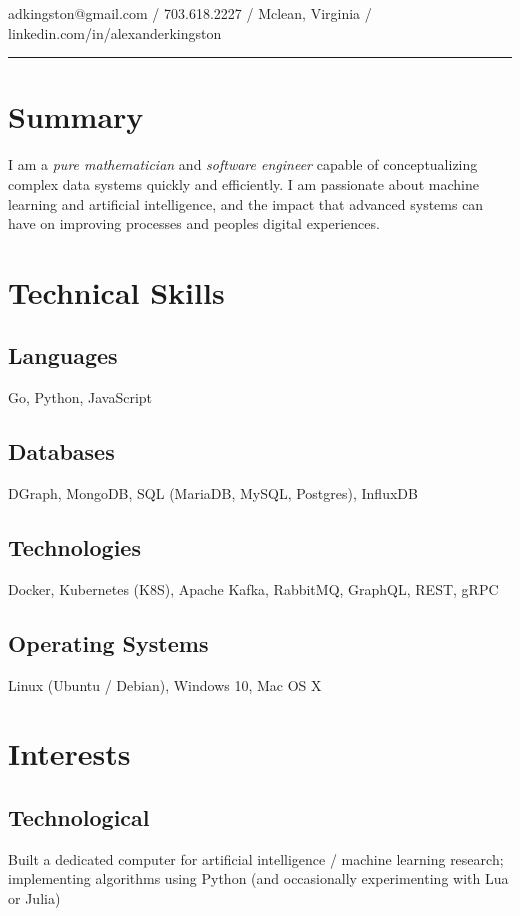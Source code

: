 \documentclass{adk_cv}
\begin{document}
\color{default}
\noindent {}

\noindent adkingston@gmail.com \hfill / \hfill 703.618.2227 \hfill / \hfill Mclean, Virginia \hfill / \hfill linkedin.com/in/alexanderkingston
\noindent\rule{\textwidth}{1pt}

\begingroup\hspace{-15pt}\endgroup
\begin{minipage}[t]{\dimexpr.36\linewidth}
    \begin{flushleft}
    \section{Summary}
    I am a \textit{pure mathematician} and \textit{software engineer} capable of conceptualizing complex data systems quickly and efficiently.
    I am passionate about machine learning and artificial intelligence, and the impact that advanced systems can have on improving processes and peoples digital experiences.

\section{Technical Skills}
\subsection{Languages}
Go, Python, JavaScript


\subsection{Databases}
DGraph, MongoDB, SQL (MariaDB, MySQL, Postgres), InfluxDB


\subsection{Technologies}
Docker, Kubernetes (K8S), Apache Kafka, RabbitMQ, GraphQL, REST, gRPC


\subsection{Operating Systems}
Linux (Ubuntu / Debian), Windows 10, Mac OS X

\section{Interests}
\subsection{Technological}
Built a dedicated computer for artificial intelligence / machine learning research; implementing algorithms using Python (and occasionally experimenting with Lua or Julia) \\ 



\end{flushleft}
\end{minipage}
\end{document}
